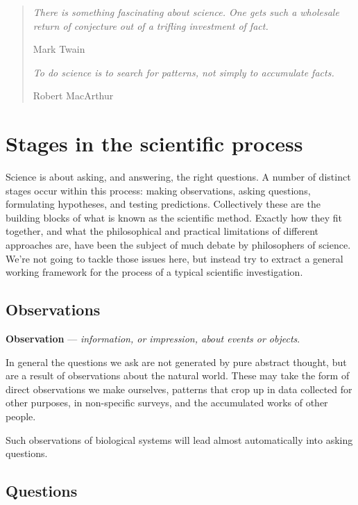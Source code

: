 \documentclass[
]{book}
\begin{document}
\begin{quote}
\emph{There is something fascinating about science. One gets such a wholesale return of conjecture out of a trifling investment of fact.}

Mark Twain

\emph{To do science is to search for patterns, not simply to accumulate facts.}

Robert MacArthur
\end{quote}

\hypertarget{stages-scientific-process}{%
\section{Stages in the scientific process}\label{stages-scientific-process}}

Science is about asking, and answering, the right questions. A number of distinct stages occur within this process: making observations, asking questions, formulating hypotheses, and testing predictions. Collectively these are the building blocks of what is known as the scientific method. Exactly how they fit together, and what the philosophical and practical limitations of different approaches are, have been the subject of much debate by philosophers of science. We're not going to tackle those issues here, but instead try to extract a general working framework for the process of a typical scientific investigation.

\hypertarget{stages-observations}{%
\subsection{Observations}\label{stages-observations}}

\textbf{Observation} --- \emph{information, or impression, about events or objects}.

In general the questions we ask are not generated by pure abstract thought, but are a result of observations about the natural world. These may take the form of direct observations we make ourselves, patterns that crop up in data collected for other purposes, in non-specific surveys, and the accumulated works of other people.

Such observations of biological systems will lead almost automatically into asking questions.

\hypertarget{stages-questions}{%
\subsection{Questions}\label{stages-questions}}
\end{document}
